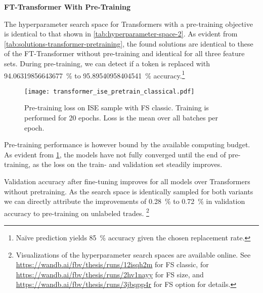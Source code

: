 \vskip 1.3in

\textbf{FT-Transformer With Pre-Training}

The hyperparameter search space for Transformers with a pre-training objective is identical to that shown in \cref{tab:hyperparameter-space-2}. As evident from \cref{tab:solutions-transformer-pretraining}, the found solutions are identical to these of the FT-Transformer without pre-training and identical for all three feature sets. During pre-training, we can detect if a token is replaced with \SI{94.06319856643677}{\percent} to \SI{95.89540958404541}{\percent} accuracy.\footnote{Na\"ive prediction yields \SI{85}{\percent} accuracy given the chosen replacement rate.}

\begin{figure}[!h]
    \centering
    \texttt{[image: transformer\_ise\_pretrain\_classical.pdf]}
    \caption[Pre-Training Loss of FT-Transformer]{Pre-training loss on \gls{ISE} sample with \gls{FS} classic. Training is performed for 20 epochs. Loss is the mean over all batches per epoch.}
    \label{fig:fttransformer-pretrain-loss}
\end{figure}

Pre-training performance is however bound by the available computing budget. As evident from \cref{fig:fttransformer-pretrain-loss}, the models have not fully converged until the end of pre-training, as the loss on the train- and validation set steadily improves.

Validation accuracy after fine-tuning improves for all models over Transformers without pretraining. As the search space is identically sampled for both variants we can directly attribute the improvements of \SI{0.28}{\percent} to \SI{0.72}{\percent} in validation accuracy to pre-training on unlabeled trades. \footnote{Visualizations of the hyperparameter search spaces are available online. See \url{https://wandb.ai/fbv/thesis/runs/12isqh2m} for \gls{FS} classic, for \url{https://wandb.ai/fbv/thesis/runs/2hv1nayy} for \gls{FS} size, and \url{https://wandb.ai/fbv/thesis/runs/3jbqpp4r} for \gls{FS} option for details.}


